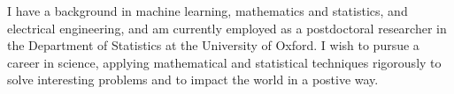 \documentclass[9pt]{developercv} %
\begin{document}
\vspace{1cm}



\begin{minipage}[t]{\textwidth} %
    \vspace{-\baselineskip} %
    {
      I have a background in machine learning, mathematics and statistics, and electrical engineering, and am currently employed as a postdoctoral researcher in the Department of Statistics at the University of Oxford.
      I wish to pursue a career in science, applying mathematical and statistical techniques rigorously to solve interesting problems and to impact the world in a postive way.


      
      
    }


\end{minipage}
\end{document}
